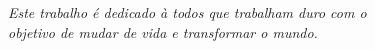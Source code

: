 \begin{dedicatoria}
   \vspace*{\fill}
   \centering
   \noindent
   \textit{Este trabalho é dedicado à todos que trabalham duro com o \\objetivo de mudar de vida e transformar o mundo.} \vspace*{\fill}
\end{dedicatoria}

